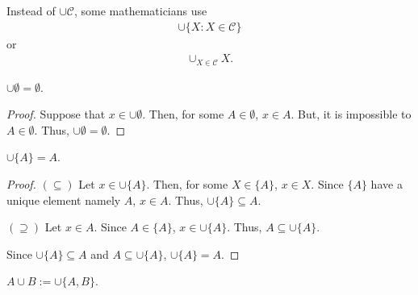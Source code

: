 Instead of $\cup \mathcal{C}$, some mathematicians use 
\begin{align*}
 \cup \{ X : X \in \mathcal{C} \}   
\end{align*}
or
\begin{align*}
  \cup_{X\in\mathcal{C}} X.
\end{align*}

\begin{theorem*}$\cup{\emptyset} = \emptyset$.\end{theorem*}
\begin{proof}
    Suppose that $x \in \cup \emptyset$. Then, for some $A \in \emptyset$,
    $x \in A$. But, it is impossible to $A \in \emptyset$. Thus, 
    $\cup{\emptyset} = \emptyset$.
\end{proof}

\begin{theorem*}$\cup \{A\} = A$.\end{theorem*}
\begin{proof}
    $(\subseteq)$ Let $x \in \cup\{A\}$. Then, for some $X \in \{A\}$,
    $x \in X$. Since $\{A\}$ have a unique element namely $A$,
    $x \in A$. Thus, $\cup\{A\} \subseteq A$.
   
    $(\supseteq)$ Let $x \in A$. Since $A \in \{A\}$, $x \in \cup\{A\}$.
    Thus, $A \subseteq \cup\{A\}$. 
    
    Since $\cup\{A\} \subseteq A$ and $A \subseteq \cup\{A\}$, 
    $\cup\{A\} = A$.
\end{proof}

\newpage{}

\begin{definition*}
   $A \cup B := \cup\{A,B\}$. 
\end{definition*}
